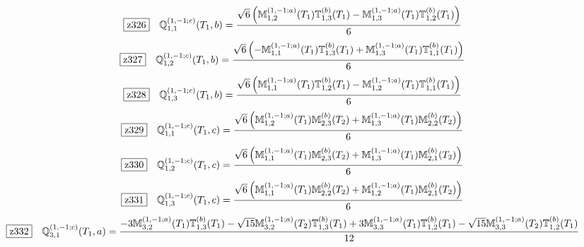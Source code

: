 \documentclass[fleqn,10pt,landscape]{jsarticle}
\begin{document}
\begin{dmath*}
\hspace*{3mm}\fbox{z326}\quad \mathbb{Q}_{1,1}^{(1,-1;c)}(T_{1},b)=\frac{\sqrt{6} \left(\mathbb{M}_{1,2}^{(1,-1;a)}(T_{1}) \mathbb{T}_{1,3}^{(b)}(T_{1}) - \mathbb{M}_{1,3}^{(1,-1;a)}(T_{1}) \mathbb{T}_{1,2}^{(b)}(T_{1})\right)}{6}
\end{dmath*}
\begin{dmath*}
\hspace*{3mm}\fbox{z327}\quad \mathbb{Q}_{1,2}^{(1,-1;c)}(T_{1},b)=\frac{\sqrt{6} \left(- \mathbb{M}_{1,1}^{(1,-1;a)}(T_{1}) \mathbb{T}_{1,3}^{(b)}(T_{1}) + \mathbb{M}_{1,3}^{(1,-1;a)}(T_{1}) \mathbb{T}_{1,1}^{(b)}(T_{1})\right)}{6}
\end{dmath*}
\begin{dmath*}
\hspace*{3mm}\fbox{z328}\quad \mathbb{Q}_{1,3}^{(1,-1;c)}(T_{1},b)=\frac{\sqrt{6} \left(\mathbb{M}_{1,1}^{(1,-1;a)}(T_{1}) \mathbb{T}_{1,2}^{(b)}(T_{1}) - \mathbb{M}_{1,2}^{(1,-1;a)}(T_{1}) \mathbb{T}_{1,1}^{(b)}(T_{1})\right)}{6}
\end{dmath*}
\begin{dmath*}
\hspace*{3mm}\fbox{z329}\quad \mathbb{Q}_{1,1}^{(1,-1;c)}(T_{1},c)=\frac{\sqrt{6} \left(\mathbb{M}_{1,2}^{(1,-1;a)}(T_{1}) \mathbb{M}_{2,3}^{(b)}(T_{2}) + \mathbb{M}_{1,3}^{(1,-1;a)}(T_{1}) \mathbb{M}_{2,2}^{(b)}(T_{2})\right)}{6}
\end{dmath*}
\begin{dmath*}
\hspace*{3mm}\fbox{z330}\quad \mathbb{Q}_{1,2}^{(1,-1;c)}(T_{1},c)=\frac{\sqrt{6} \left(\mathbb{M}_{1,1}^{(1,-1;a)}(T_{1}) \mathbb{M}_{2,3}^{(b)}(T_{2}) + \mathbb{M}_{1,3}^{(1,-1;a)}(T_{1}) \mathbb{M}_{2,1}^{(b)}(T_{2})\right)}{6}
\end{dmath*}
\begin{dmath*}
\hspace*{3mm}\fbox{z331}\quad \mathbb{Q}_{1,3}^{(1,-1;c)}(T_{1},c)=\frac{\sqrt{6} \left(\mathbb{M}_{1,1}^{(1,-1;a)}(T_{1}) \mathbb{M}_{2,2}^{(b)}(T_{2}) + \mathbb{M}_{1,2}^{(1,-1;a)}(T_{1}) \mathbb{M}_{2,1}^{(b)}(T_{2})\right)}{6}
\end{dmath*}
\begin{dmath*}
\hspace*{3mm}\fbox{z332}\quad \mathbb{Q}_{3,1}^{(1,-1;c)}(T_{1},a)=\frac{- 3 \mathbb{M}_{3,2}^{(1,-1;a)}(T_{1}) \mathbb{T}_{1,3}^{(b)}(T_{1}) - \sqrt{15} \mathbb{M}_{3,2}^{(1,-1;a)}(T_{2}) \mathbb{T}_{1,3}^{(b)}(T_{1}) + 3 \mathbb{M}_{3,3}^{(1,-1;a)}(T_{1}) \mathbb{T}_{1,2}^{(b)}(T_{1}) - \sqrt{15} \mathbb{M}_{3,3}^{(1,-1;a)}(T_{2}) \mathbb{T}_{1,2}^{(b)}(T_{1})}{12}
\end{dmath*}
\end{document}
